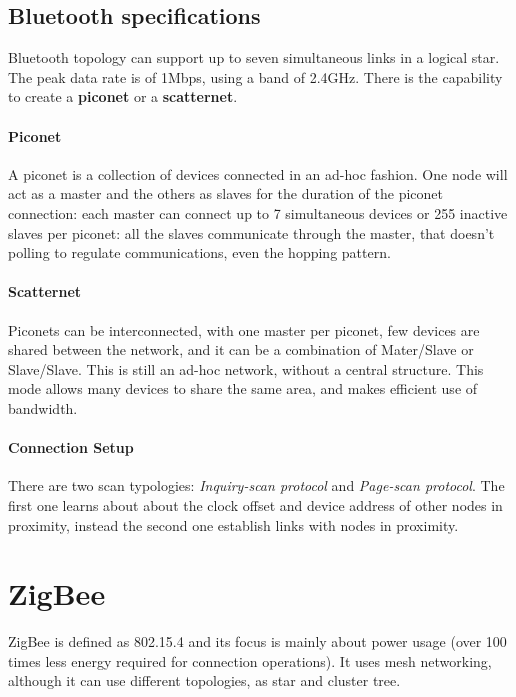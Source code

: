 \subsection{Bluetooth specifications}

Bluetooth topology can support up to seven simultaneous links in a logical star.
The peak data rate is of 1Mbps, using a band of 2.4GHz.
There is the capability to create a \textbf{piconet} or a \textbf{scatternet}.

\paragraph*{Piconet} A piconet is a collection of devices connected in an ad-hoc
fashion. One node will act as a master and the others as slaves for the duration
of the piconet connection: each master can connect up to 7 simultaneous devices
or 255 inactive slaves per piconet: all the slaves communicate through the
master, that doesn't polling to regulate communications, even the hopping
pattern.

\paragraph*{Scatternet} Piconets can be interconnected, with one master per
piconet, few devices are shared between the network, and it can be a combination
of Mater/Slave or Slave/Slave. This is still an ad-hoc network, without a
central structure. This mode allows many devices to share the same area, and
makes efficient use of bandwidth.

\paragraph*{Connection Setup} There are two scan typologies:
\textit{Inquiry-scan protocol} and \textit{Page-scan protocol}. The first one
learns about about the clock offset and device address of other nodes in
proximity, instead the second one establish links with nodes in proximity.

\section{ZigBee}

ZigBee is defined as 802.15.4 and its focus is mainly about power usage (over
100 times less energy required for connection operations). It uses mesh
networking, although it can use different topologies, as star and cluster tree.

